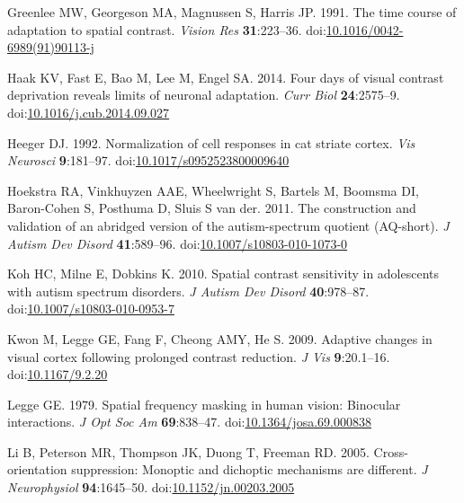 \documentclass[
]{article}
\newlength{\cslhangindent}
\newlength{\cslentryspacingunit} %
\newenvironment{CSLReferences}[2] %
 {%
  \setlength{\parindent}{0pt}
  \ifodd #1
  \let\oldpar\par
  \def\par{\hangindent=\cslhangindent\oldpar}
  \fi
  \setlength{\parskip}{#2\cslentryspacingunit}
 }%
 {}
\begin{document}
\begin{CSLReferences}{1}{0}
\leavevmode{}%
Greenlee MW, Georgeson MA, Magnussen S, Harris JP. 1991. The time course of adaptation to spatial contrast. \emph{Vision Res} \textbf{31}:223--36. doi:\href{https://doi.org/10.1016/0042-6989(91)90113-j}{10.1016/0042-6989(91)90113-j}

\leavevmode{}%
Haak KV, Fast E, Bao M, Lee M, Engel SA. 2014. Four days of visual contrast deprivation reveals limits of neuronal adaptation. \emph{Curr Biol} \textbf{24}:2575--9. doi:\href{https://doi.org/10.1016/j.cub.2014.09.027}{10.1016/j.cub.2014.09.027}

\leavevmode{}%
Heeger DJ. 1992. Normalization of cell responses in cat striate cortex. \emph{Vis Neurosci} \textbf{9}:181--97. doi:\href{https://doi.org/10.1017/s0952523800009640}{10.1017/s0952523800009640}

\leavevmode{}%
Hoekstra RA, Vinkhuyzen AAE, Wheelwright S, Bartels M, Boomsma DI, Baron-Cohen S, Posthuma D, Sluis S van der. 2011. The construction and validation of an abridged version of the autism-spectrum quotient (AQ-short). \emph{J Autism Dev Disord} \textbf{41}:589--96. doi:\href{https://doi.org/10.1007/s10803-010-1073-0}{10.1007/s10803-010-1073-0}

\leavevmode{}%
Koh HC, Milne E, Dobkins K. 2010. Spatial contrast sensitivity in adolescents with autism spectrum disorders. \emph{J Autism Dev Disord} \textbf{40}:978--87. doi:\href{https://doi.org/10.1007/s10803-010-0953-7}{10.1007/s10803-010-0953-7}

\leavevmode{}%
Kwon M, Legge GE, Fang F, Cheong AMY, He S. 2009. Adaptive changes in visual cortex following prolonged contrast reduction. \emph{J Vis} \textbf{9}:20.1--16. doi:\href{https://doi.org/10.1167/9.2.20}{10.1167/9.2.20}

\leavevmode{}%
Legge GE. 1979. Spatial frequency masking in human vision: Binocular interactions. \emph{J Opt Soc Am} \textbf{69}:838--47. doi:\href{https://doi.org/10.1364/josa.69.000838}{10.1364/josa.69.000838}

\leavevmode{}%
Li B, Peterson MR, Thompson JK, Duong T, Freeman RD. 2005. Cross-orientation suppression: Monoptic and dichoptic mechanisms are different. \emph{J Neurophysiol} \textbf{94}:1645--50. doi:\href{https://doi.org/10.1152/jn.00203.2005}{10.1152/jn.00203.2005}


\end{CSLReferences}
\end{document}
